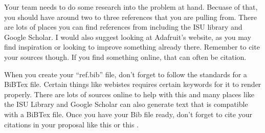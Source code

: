 \documentclass[12pt]{article}
\begin{document}
Your team needs to do some research into the problem at hand. Becuase of that, you should have around two to three references that you are pulling from. There are lots of places you can find references from including the ISU library and Google Scholar. I would also suggest looking at Adafruit's website, as you may find inspiration or looking to improve something already there. Remember to cite your sources though. If you find something online, that can often be citation.

When you create your ``ref.bib'' file, don't forget to follow the standards for a BiBTex file. Certain things like webistes requires certain keywords for it to render properly. There are lots of sources online to help with this and many places like the ISU Library and Google Scholar can also generate text that is compatible with a BiBTex file. Once you have your Bib file ready, don't forget to cite your citations in your proposal like this \cite{einstein} or this \cite{dirac}.
\end{document}
